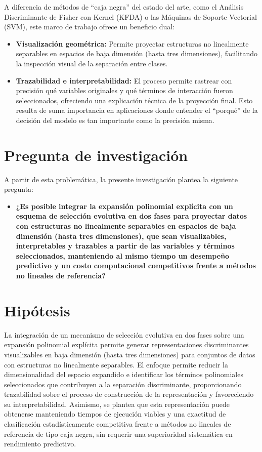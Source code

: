 A diferencia de métodos de ``caja negra'' del estado del arte, como el Análisis Discriminante de Fisher con Kernel (KFDA) o las Máquinas de Soporte Vectorial (SVM), este marco de trabajo ofrece un beneficio dual:

\begin{itemize}
	\item \textbf{Visualización geométrica:} Permite proyectar estructuras no linealmente separables en espacios de baja dimensión (hasta tres dimensiones), facilitando la inspección visual de la separación entre clases.
	
	\item \textbf{Trazabilidad e interpretabilidad:} El proceso permite rastrear con precisión qué variables originales y qué términos de interacción fueron seleccionados, ofreciendo una explicación técnica de la proyección final. Esto resulta de suma importancia en aplicaciones donde entender el ``porqué'' de la decisión del modelo es tan importante como la precisión misma.
\end{itemize}

\section{Pregunta de investigación}
\label{sec:Pregunta-Investigación}

A partir de esta problemática, la presente investigación plantea la siguiente pregunta:

\begin{itemize}
	\item \textbf{¿Es posible integrar la expansión polinomial explícita con un esquema de selección evolutiva en dos fases para proyectar datos con estructuras no linealmente separables en espacios de baja dimensión (hasta tres dimensiones), que sean visualizables, interpretables y trazables a partir de las variables y términos seleccionados, manteniendo al mismo tiempo un desempeño predictivo y un costo computacional competitivos frente a métodos no lineales de referencia?}
\end{itemize}

\section{Hipótesis}
\label{sec:Hipótesis}

La integración de un mecanismo de selección evolutiva en dos fases sobre una expansión polinomial explícita permite generar representaciones discriminantes visualizables en baja dimensión (hasta tres dimensiones) para conjuntos de datos con estructuras no linealmente separables. El enfoque permite reducir la dimensionalidad del espacio expandido e identificar los términos polinomiales seleccionados que contribuyen a la separación discriminante, proporcionando trazabilidad sobre el proceso de construcción de la representación y favoreciendo su interpretabilidad. Asimismo, se plantea que esta representación puede obtenerse manteniendo tiempos de ejecución viables y una exactitud de clasificación estadísticamente competitiva frente a métodos no lineales de referencia de tipo caja negra, sin requerir una superioridad sistemática en rendimiento predictivo.

